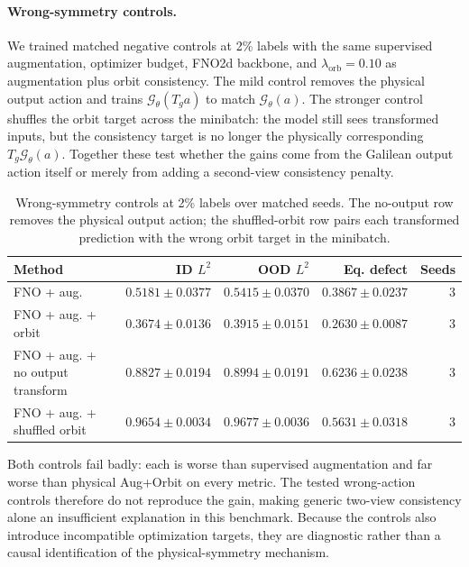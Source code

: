 \paragraph{Wrong-symmetry controls.} We trained matched negative controls at 2\% labels with the same supervised augmentation, optimizer budget, FNO2d backbone, and \(\lambda_{\mathrm{orb}}=0.10\) as augmentation plus orbit consistency. The mild control removes the physical output action and trains \(\mathcal G_\theta(T_g a)\) to match \(\mathcal G_\theta(a)\). The stronger control shuffles the orbit target across the minibatch: the model still sees transformed inputs, but the consistency target is no longer the physically corresponding \(T_g\mathcal G_\theta(a)\). Together these test whether the gains come from the Galilean output action itself or merely from adding a second-view consistency penalty.

\begin{table}[t]
\centering
\small
\caption{Wrong-symmetry controls at 2\% labels over matched seeds. The no-output row removes the physical output action; the shuffled-orbit row pairs each transformed prediction with the wrong orbit target in the minibatch.}
\label{tab:new-wrong-symmetry-control}
\begin{tabular}{lrrrr}
\toprule
Method & ID \(L^2\) & OOD \(L^2\) & Eq. defect & Seeds \\
\midrule
FNO + aug. & \(0.5181\pm0.0377\) & \(0.5415\pm0.0370\) & \(0.3867\pm0.0237\) & 3 \\
FNO + aug. + orbit & \(0.3674\pm0.0136\) & \(0.3915\pm0.0151\) & \(0.2630\pm0.0087\) & 3 \\
FNO + aug. + no output transform & \(0.8827\pm0.0194\) & \(0.8994\pm0.0191\) & \(0.6236\pm0.0238\) & 3 \\
FNO + aug. + shuffled orbit & \(0.9654\pm0.0034\) & \(0.9677\pm0.0036\) & \(0.5631\pm0.0318\) & 3 \\
\bottomrule
\end{tabular}
\end{table}

Both controls fail badly: each is worse than supervised augmentation and far worse than physical Aug+Orbit on every metric. The tested wrong-action controls therefore do not reproduce the gain, making generic two-view consistency alone an insufficient explanation in this benchmark. Because the controls also introduce incompatible optimization targets, they are diagnostic rather than a causal identification of the physical-symmetry mechanism.


